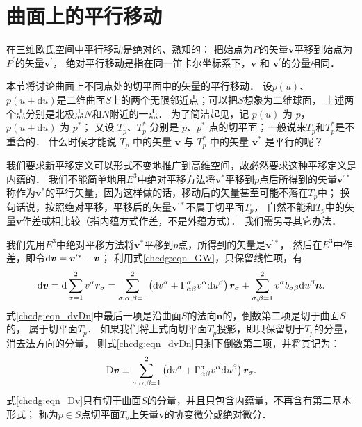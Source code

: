 \section{曲面上的平行移动}\label{chcdg:sec_pt}
在三维欧氏空间中平行移动是绝对的、熟知的：
把始点为$P$的矢量$\boldsymbol{v}$平移到始点为$P^{\prime}$的矢量$\boldsymbol{v}^{\prime}$，
{\kaishu 绝对平行移动}是指在同一笛卡尔坐标系下，$\boldsymbol{v}$ 和 $\boldsymbol{v}^{\prime}$的分量相同．


本节将讨论曲面上不同点处的切平面中的矢量的平行移动．
设$p(u)$、$ p(u+\mathrm{d} u)$是二维曲面$S$上的两个无限邻近点；可以把$S$想象为二维球面，
上述两个点分别是北极点$N$和$N$附近的一点．
为了简洁起见，记 $p(u)$ 为 $p$，$ p(u+\mathrm{d} u)$ 为 $p^*$；
又设 $T_p$、$ T_p^*$ 分别是 $p$、$ p^*$ 点的切平面；一般说来$T_p$和$ T_p^*$是不重合的．
什么时候才能说 $T_p$ 中的矢量 $\boldsymbol{v}$ 与 $T_p^*$ 中的矢量 $\boldsymbol{v}^*$ 是平行的呢？

我们要求{\kaishu 新平移定义}可以形式不变地推广到高维空间，故必然要求这种平移定义是内蕴的．
我们不能简单地用$E^3$中绝对平移方法将$\boldsymbol{v}^*$平移到$p$点后所得到的矢量$\boldsymbol{v}^{\prime *}$
称作为$\boldsymbol{v}^*$的平行矢量，因为这样做的话，移动后的矢量甚至可能不落在$T_p$中；
换句话说，按照绝对平移，平移后的矢量$\boldsymbol{v}^{\prime *}$不属于切平面$T_p$，
自然不能和$T_p$中的矢量$\boldsymbol{v}$作差或相比较（指内蕴方式作差，不是外蕴方式）．
我们需另寻其它办法．

我们先用$E^3$中绝对平移方法将$\boldsymbol{v}^*$平移到$p$点，所得到的矢量是$\boldsymbol{v}^{\prime *}$，
然后在$E^3$中作差，即令${\rm d} \boldsymbol{v} = \boldsymbol{v}^{\prime *} -\boldsymbol{v}$；
利用式\eqref{chcdg:eqn_GW}，只保留线性项，有
\begin{align}
    {\rm d} \boldsymbol{v}= \mathrm{d} \sum_{\sigma=1}^{2} v^\sigma \boldsymbol{r}_\sigma 
    = \sum_{\sigma,\alpha,\beta=1}^{2} \left(\mathrm{d}   v^\sigma  
    + \Gamma_{\alpha \beta}^\sigma v^\alpha \mathrm{d} u^\beta  \right) \boldsymbol{r}_\sigma
    + \sum_{\sigma,\beta=1}^{2} v^\sigma b_{\sigma \beta}  \mathrm{d} u^\beta \boldsymbol{n} . 
    \label{chcdg:eqn_dvDn}
\end{align} %
式\eqref{chcdg:eqn_dvDn}中最后一项是沿曲面$S$的法向$\boldsymbol{n}$的，倒数第二项是切于曲面$S$的，
属于切平面$T_p$．
如果我们将上式向切平面$T_p$投影，即只保留切于$T_p$的分量，消去法方向的分量，
则式\eqref{chcdg:eqn_dvDn}只剩下倒数第二项，并将其记为：
\begin{equation}\label{chcdg:eqn_Dv}
    {\rm D} \boldsymbol{v} \equiv \sum_{\sigma,\alpha,\beta=1}^{2} \left(\mathrm{d} v^\sigma  
    +  \Gamma_{\alpha \beta}^\sigma v^\alpha \mathrm{d} u^\beta  \right) \boldsymbol{r}_\sigma .
\end{equation}
式\eqref{chcdg:eqn_Dv}只有切于曲面$S$的分量，并且只包含内蕴量，不再含有第二基本形式；
称为$p\in S$点切平面$T_p$上矢量$\boldsymbol{v}$的{\heiti 协变微分}或{\heiti 绝对微分}．

